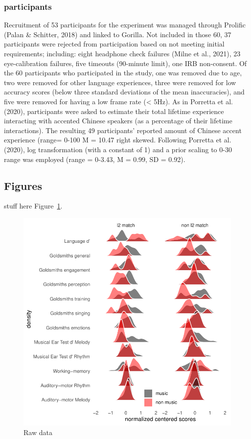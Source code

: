 \documentclass[a4paper]{article}
\begin{document}
\subsubsection{participants}

Recruitment of 53 participants for the experiment was
managed through Prolific (Palan & Schitter, 2018) and linked to Gorilla. Not included
in those 60, 37 participants were rejected from participation based on not meeting
initial requirements; including: eight headphone check failures (Milne et al., 2021), 23
eye-calibration failures, five timeouts (90-minute limit), one IRB non-consent. Of the 60
participants who participated in the study, one was removed due to age, two were
removed for other language experiences, three were removed for low accuracy scores
(below three standard deviations of the mean inaccuracies), and five were removed for
having a low frame rate (< 5Hz). As in Porretta et al. (2020), participants were asked
to estimate their total lifetime experience interacting with accented Chinese speakers
(as a percentage of their lifetime interactions). The resulting 49 participants’ reported
amount of Chinese accent experience (range= 0-100 M = 10.47%
right skewed. Following Porretta et al. (2020), log transformation (with a constant of 1)
and a prior scaling to 0-30 range was employed (range = 0-3.43, M = 0.99, SD = 0.92).

\subsection{Figures}

stuff here Figure~\ref{fig:raw_data}.

\begin{figure}[t]
  \centering
  \includegraphics[width=\linewidth]{SP_24_visuals/Normalized_score_distrubutions_by_task.pdf}
  \caption{Raw data}
  \label{fig:raw_data}
\end{figure}
\end{document}
